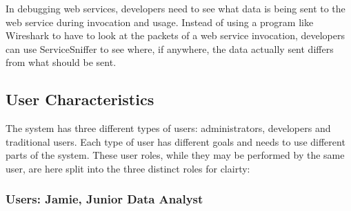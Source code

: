 \documentclass[titlepage]{article}
\begin{document}
In debugging web services, developers need to see what data is being sent to
the web service during invocation and usage.  Instead of using a program like
Wireshark to have to look at the packets of a web service invocation,
developers can use ServiceSniffer to see where, if anywhere, the data actually
sent differs from what should be sent.


\subsection{User Characteristics%
  \label{user-characteristics}%
}

The system has three different types of users:  administrators, developers and
traditional users.  Each type of user has different goals and needs to use
different parts of the system.  These user roles, while they may be performed
by the same user, are here split into the three distinct roles for clairty:


\subsubsection{Users: Jamie, Junior Data Analyst%
  \label{jamie}%
}
\end{document}
